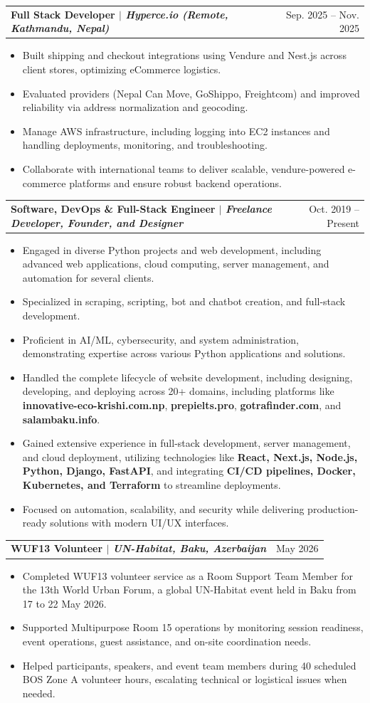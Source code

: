 \documentclass[letterpaper,11pt]{article}
\makeatletter
\newcommand{\resumeItem}[1]{
  \item \small{#1} %
}
\newcommand{\resumeTitleDate}[2]{
    \begin{tabular*}{0.97\textwidth}[t]{l@{\extracolsep{\fill}}r} %
      \textbf{#1} & \small{#2} \\ %
    \end{tabular*}\vspace{2pt} %
}
\newcommand{\resumeItemListStart}{\begin{itemize}[leftmargin=0.25in, label=\textbullet, itemsep=1pt, topsep=1pt, parsep=0pt]\small} %
\newcommand{\resumeItemListEnd}{\end{itemize}} %
\makeatother
\begin{document}
    \item
        \resumeTitleDate
            {\textbf{Full Stack Developer} $|$ \footnotesize\emph{Hyperce.io (Remote, Kathmandu, Nepal)}}
            {Sep. 2025 -- Nov. 2025}
        \resumeItemListStart
            \resumeItem{Built shipping and checkout integrations using Vendure and Nest.js across client stores, optimizing eCommerce logistics.}
            \resumeItem{Evaluated providers (Nepal Can Move, GoShippo, Freightcom) and improved reliability via address normalization and geocoding.}
            \resumeItem{Manage AWS infrastructure, including logging into EC2 instances and handling deployments, monitoring, and troubleshooting.}
            \resumeItem{Collaborate with international teams to deliver scalable, vendure-powered e-commerce platforms and ensure robust backend operations.}
        \resumeItemListEnd

    \item
        \resumeTitleDate
            {\textbf{Software, DevOps \& Full-Stack Engineer} $|$ \footnotesize\emph{Freelance Developer, Founder, and Designer}}
            {Oct. 2019 -- Present}
        \resumeItemListStart
            \resumeItem{Engaged in diverse Python projects and web development, including advanced web applications, cloud computing, server management, and automation for several clients.}
            \resumeItem{Specialized in scraping, scripting, bot and chatbot creation, and full-stack development.}
            \resumeItem{Proficient in AI/ML, cybersecurity, and system administration, demonstrating expertise across various Python applications and solutions.}
            \resumeItem{Handled the complete lifecycle of website development, including designing, developing, and deploying across 20+ domains, including platforms like \textbf{innovative-eco-krishi.com.np}, \textbf{prepielts.pro}, \textbf{gotrafinder.com}, and \textbf{salambaku.info}.}
            \resumeItem{Gained extensive experience in full-stack development, server management, and cloud deployment, utilizing technologies like \textbf{React, Next.js, Node.js, Python, Django, FastAPI}, and integrating \textbf{CI/CD pipelines, Docker, Kubernetes, and Terraform} to streamline deployments.}
            \resumeItem{Focused on automation, scalability, and security while delivering production-ready solutions with modern UI/UX interfaces.}
        \resumeItemListEnd

    \item
        \resumeTitleDate
            {\textbf{WUF13 Volunteer} $|$ \footnotesize\emph{UN-Habitat, Baku, Azerbaijan}}
            {May 2026}
        \resumeItemListStart
            \resumeItem{Completed WUF13 volunteer service as a Room Support Team Member for the 13th World Urban Forum, a global UN-Habitat event held in Baku from 17 to 22 May 2026.}
            \resumeItem{Supported Multipurpose Room 15 operations by monitoring session readiness, event operations, guest assistance, and on-site coordination needs.}
            \resumeItem{Helped participants, speakers, and event team members during 40 scheduled BOS Zone A volunteer hours, escalating technical or logistical issues when needed.}
        \resumeItemListEnd
\end{document}
